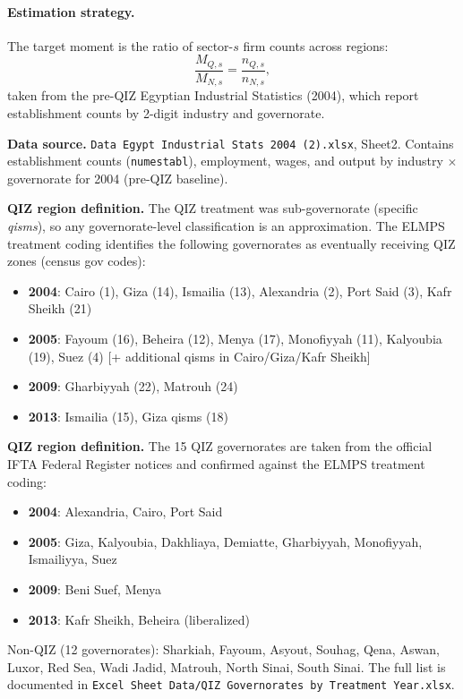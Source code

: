\documentclass[12pt]{article}
\begin{document}
\paragraph{Estimation strategy.}
The target moment is the ratio of sector-$s$ firm counts across regions:
\[
\frac{M_{Q,s}}{M_{N,s}} = \frac{n_{Q,s}}{n_{N,s}},
\]
taken from the pre-QIZ Egyptian Industrial Statistics (2004), which report
establishment counts by 2-digit industry and governorate.

\medskip
\noindent\textbf{Data source.}
\texttt{Data Egypt Industrial Stats 2004 (2).xlsx}, Sheet2. Contains
establishment counts (\texttt{numestabl}), employment, wages, and output
by industry $\times$ governorate for 2004 (pre-QIZ baseline).

\medskip
\noindent\textbf{QIZ region definition.}
The QIZ treatment was sub-governorate (specific \textit{qisms}), so
any governorate-level classification is an approximation. The ELMPS
treatment coding identifies the following governorates as eventually
receiving QIZ zones (census gov codes):
\begin{itemize}
  \item \textbf{2004}: Cairo (1), Giza (14), Ismailia (13), Alexandria (2),
        Port Said (3), Kafr Sheikh (21)
  \item \textbf{2005}: Fayoum (16), Beheira (12), Menya (17), Monofiyyah (11),
        Kalyoubia (19), Suez (4) [+ additional qisms in Cairo/Giza/Kafr Sheikh]
  \item \textbf{2009}: Gharbiyyah (22), Matrouh (24)
  \item \textbf{2013}: Ismailia (15), Giza qisms (18)
\end{itemize}

\medskip
\noindent\textbf{QIZ region definition.}
The 15 QIZ governorates are taken from the official IFTA Federal Register
notices and confirmed against the ELMPS treatment coding:
\begin{itemize}
  \item \textbf{2004}: Alexandria, Cairo, Port Said
  \item \textbf{2005}: Giza, Kalyoubia, Dakhliaya, Demiatte, Gharbiyyah,
        Monofiyyah, Ismailiyya, Suez
  \item \textbf{2009}: Beni Suef, Menya
  \item \textbf{2013}: Kafr Sheikh, Beheira (liberalized)
\end{itemize}
Non-QIZ (12 governorates): Sharkiah, Fayoum, Asyout, Souhag, Qena, Aswan,
Luxor, Red Sea, Wadi Jadid, Matrouh, North Sinai, South Sinai.
The full list is documented in
\texttt{Excel Sheet Data/QIZ Governorates by Treatment Year.xlsx}.
\end{document}
